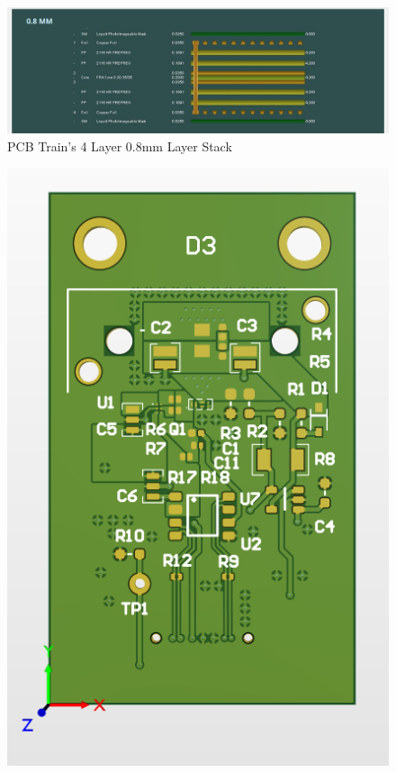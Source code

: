 \documentclass[a4paper,11pt]{article}
\begin{document}
\begin{figure}[htbp]
\centering
\includegraphics[scale=0.5]{PCBTrain0.84layer.png}
\caption{PCB Train's 4 Layer 0.8mm Layer Stack\label{fig:PCBTrain0.84layer}}
\end{figure}

\begin{figure}[htbp]
\centering
\includegraphics[scale=0.5]{PulserBoard0.93DTop.png}
\qquad

\end{figure}
\end{document}
